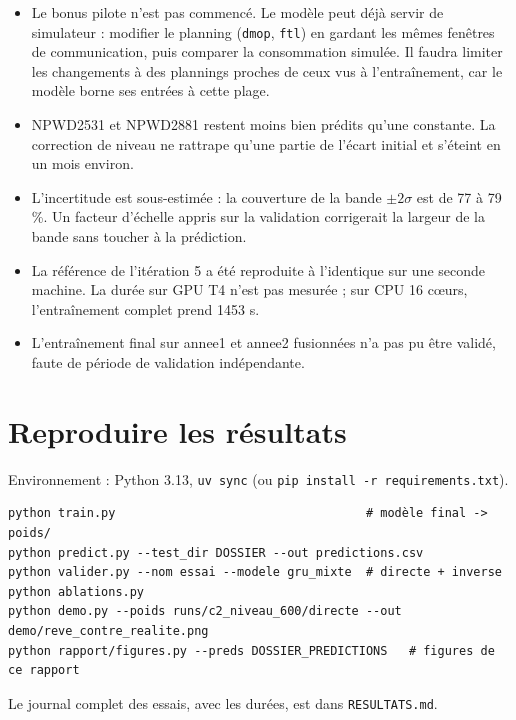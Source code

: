 \documentclass[11pt,a4paper]{article}
\newcommand{\code}[1]{\texttt{#1}}
\begin{document}
\begin{itemize}
  \item Le bonus pilote n'est pas commencé. Le modèle peut déjà servir de simulateur : modifier le planning (\code{dmop}, \code{ftl}) en gardant les mêmes fenêtres de communication, puis comparer la consommation simulée. Il faudra limiter les changements à des plannings proches de ceux vus à l'entraînement, car le modèle borne ses entrées à cette plage.
  \item NPWD2531 et NPWD2881 restent moins bien prédits qu'une constante. La correction de niveau ne rattrape qu'une partie de l'écart initial et s'éteint en un mois environ.
  \item L'incertitude est sous-estimée : la couverture de la bande $\pm 2\sigma$ est de 77 à 79 \%. Un facteur d'échelle appris sur la validation corrigerait la largeur de la bande sans toucher à la prédiction.
  \item La référence de l'itération 5 a été reproduite à l'identique sur une seconde machine. La durée sur GPU T4 n'est pas mesurée ; sur CPU 16 cœurs, l'entraînement complet prend 1453 s.
  \item L'entraînement final sur annee1 et annee2 fusionnées n'a pas pu être validé, faute de période de validation indépendante.
\end{itemize}

\appendix
\section{Reproduire les résultats}

Environnement : Python 3.13, \code{uv sync} (ou \code{pip install -r requirements.txt}).

\begin{small}
\begin{verbatim}
python train.py                                   # modèle final -> poids/
python predict.py --test_dir DOSSIER --out predictions.csv
python valider.py --nom essai --modele gru_mixte  # directe + inverse
python ablations.py
python demo.py --poids runs/c2_niveau_600/directe --out demo/reve_contre_realite.png
python rapport/figures.py --preds DOSSIER_PREDICTIONS   # figures de ce rapport
\end{verbatim}
\end{small}

Le journal complet des essais, avec les durées, est dans \code{RESULTATS.md}.
\end{document}
